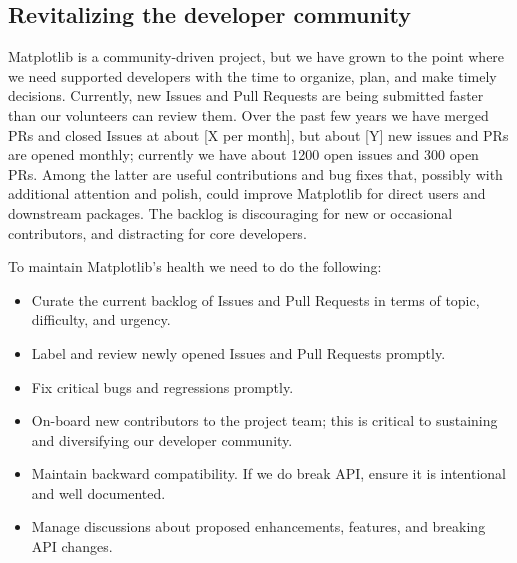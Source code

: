 \documentclass[11pt]{article}  %
\begin{document}
\subsection{Revitalizing the developer community}


Matplotlib is a community-driven project, but we have grown to the point
where we need supported developers with the time to organize, plan, and
make timely decisions.  Currently, new Issues and Pull Requests are
being submitted faster than our volunteers can review them.  Over the
past few years we have merged PRs and closed Issues at about [X per
  month], but about [Y] new issues and PRs are opened monthly;
currently we have about 1200 open issues and 300 open PRs.  Among the
latter are useful contributions and bug fixes that, possibly with
additional attention and polish, could improve Matplotlib for direct
users and downstream packages.  The backlog is discouraging for new or
occasional contributors, and distracting for core developers.

To maintain Matplotlib's health we need to do the following:

\begin{itemize}[noitemsep]
\item Curate the current backlog of Issues and Pull Requests
  in terms of topic, difficulty, and urgency.
\item Label and review newly opened Issues and Pull Requests
  promptly.
\item Fix critical bugs and regressions promptly.
\item On-board new contributors to the project team; this is critical to
  sustaining and diversifying our developer community.
\item Maintain backward compatibility.  If we do break API, ensure it
  is intentional and well documented.
\item Manage discussions about proposed enhancements, features, and
  breaking API changes.
\end{itemize}
\end{document}
